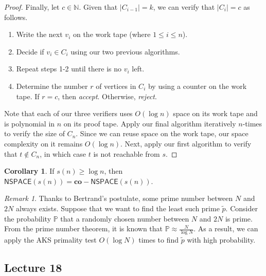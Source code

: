 \documentclass[10pt,letterpaper,cm]{nupset}
\theoremstyle{definition}
\theoremstyle{theorem}
\newtheorem{corollary}[definition]{Corollary}
\theoremstyle{remark}
\newtheorem{remark}[definition]{Remark}
\newcommand{\N}{\mathbb N}
\newcommand{\1}{\mathbf{1}}
\newcommand{\0}{\vec 0}
\begin{document}
\begin{proof}
Finally, let $c\in \N$. Given that $\left\lvert{C_{i-1}}\right\rvert=k$, we can verify that $\left\lvert{C_i}\right\rvert = c$ as follows. 
\begin{enumerate} 
\item Write the next $v_i$ on the work tape (where $1\leq i \leq n$). 
\item Decide if $v_i \in C_i$ using our two previous algorithms.
\item Repeat steps 1-2 until there is no $v_i$ left.
\item Determine the number $r$ of vertices in $C_i$ by using a counter on the work tape. If $r = c$, then \textit{accept}. Otherwise, \textit{reject}.
\end{enumerate}

Note that each of our three verifiers uses $O(\log{n})$ space on its work tape and  is polynomial in $n$ on its proof tape. Apply our final algorithm iteratively $n$-times to verify the size of  $C_n$. Since we can reuse space on the work tape, our space complexity on it remains $O(\log{n})$.  Next, apply our first algorithm to verify that $t\notin C_n$, in which case $t$ is not reachable from $s$.
\end{proof}

\begin{corollary}
If $s(n) \geq \log{n}$, then $\mathsf{NSPACE}(s(n)) = \mathbf{co}{-}\mathsf{NSPACE}(s(n))$.
\end{corollary}

\begin{remark}
Thanks to Bertrand's postulate, some prime number between $N$ and $2N$ always exists.  Suppose that we want to find the least such prime $\tilde{p}$. Consider the probability $\mathbb{P}$ that a randomly chosen number between $N$ and $2N$ is prime. From the prime number theorem, it is known that $\mathbb{P} \approx \frac{N}{\log{N}}$. As a result, we can apply the AKS primality test $O(\log{N})$ times to find $\tilde{p}$ with high probability.
\end{remark}

\subsection{Lecture 18}
\end{document}
